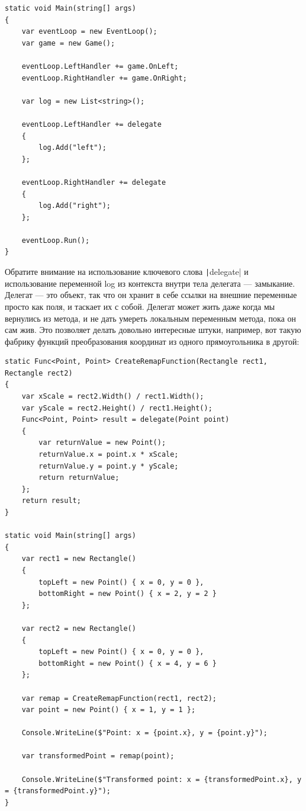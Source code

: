 \documentclass[a5paper]{article}
\begin{document}
\begin{verbatim}
static void Main(string[] args)
{
    var eventLoop = new EventLoop();
    var game = new Game();

    eventLoop.LeftHandler += game.OnLeft;
    eventLoop.RightHandler += game.OnRight;

    var log = new List<string>();

    eventLoop.LeftHandler += delegate 
    {
        log.Add("left");
    };

    eventLoop.RightHandler += delegate
    {
        log.Add("right");
    };

    eventLoop.Run();
}
\end{verbatim}

Обратите внимание на использование ключевого слова \texttt|delegate| и использование переменной log из контекста внутри тела делегата --- замыкание. Делегат --- это объект, так что он хранит в себе ссылки на внешние переменные просто как поля, и таскает их с собой. Делегат может жить даже когда мы вернулись из метода, и не дать умереть локальным переменным метода, пока он сам жив. Это позволяет делать довольно интересные штуки, например, вот такую фабрику функций преобразования координат из одного прямоугольника в другой:

\begin{verbatim}
static Func<Point, Point> CreateRemapFunction(Rectangle rect1, Rectangle rect2)
{
    var xScale = rect2.Width() / rect1.Width();
    var yScale = rect2.Height() / rect1.Height();
    Func<Point, Point> result = delegate(Point point)
    {
        var returnValue = new Point();
        returnValue.x = point.x * xScale;
        returnValue.y = point.y * yScale;
        return returnValue;
    };
    return result;
}

static void Main(string[] args)
{
    var rect1 = new Rectangle()
    {
        topLeft = new Point() { x = 0, y = 0 },
        bottomRight = new Point() { x = 2, y = 2 }
    };

    var rect2 = new Rectangle()
    {
        topLeft = new Point() { x = 0, y = 0 },
        bottomRight = new Point() { x = 4, y = 6 }
    };

    var remap = CreateRemapFunction(rect1, rect2);
    var point = new Point() { x = 1, y = 1 };

    Console.WriteLine($"Point: x = {point.x}, y = {point.y}");

    var transformedPoint = remap(point);

    Console.WriteLine($"Transformed point: x = {transformedPoint.x}, y = {transformedPoint.y}");
}
\end{verbatim}
\end{document}
